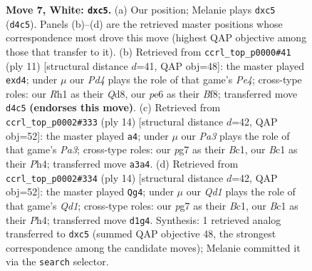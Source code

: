 \documentclass[11pt]{article}
\begin{document}
\begin{figure}[p]
\caption{\textbf{Move 7, White: \texttt{dxc5}.} (a) Our position; Melanie plays \texttt{dxc5} (\texttt{d4c5}). Panels (b)--(d) are the retrieved master positions whose correspondence most drove this move (highest QAP objective among those that transfer to it). (b) Retrieved from \texttt{ccrl\_top\_p0000\#41} (ply 11) [structural distance $d$=41, QAP obj=48]: the master played \texttt{exd4}; under $\mu$ our \emph{Pd4} plays the role of that game's \emph{Pe4}; cross-type roles: our \emph{R}h1 as their \emph{Q}d8, our \emph{p}e6 as their \emph{B}f8; transferred move \texttt{d4c5} \textbf{(endorses this move)}. (c) Retrieved from \texttt{ccrl\_top\_p0002\#333} (ply 14) [structural distance $d$=42, QAP obj=52]: the master played \texttt{a4}; under $\mu$ our \emph{Pa3} plays the role of that game's \emph{Pa3}; cross-type roles: our \emph{p}g7 as their \emph{B}c1, our \emph{B}c1 as their \emph{P}h4; transferred move \texttt{a3a4}. (d) Retrieved from \texttt{ccrl\_top\_p0002\#334} (ply 14) [structural distance $d$=42, QAP obj=52]: the master played \texttt{Qg4}; under $\mu$ our \emph{Qd1} plays the role of that game's \emph{Qd1}; cross-type roles: our \emph{p}g7 as their \emph{B}c1, our \emph{B}c1 as their \emph{P}h4; transferred move \texttt{d1g4}. Synthesis: 1 retrieved analog transferred to \texttt{dxc5} (summed QAP objective 48, the strongest correspondence among the candidate moves); Melanie committed it via the \texttt{search} selector.}
\label{fig:thought-m12}
\end{figure}

\clearpage
\end{document}
